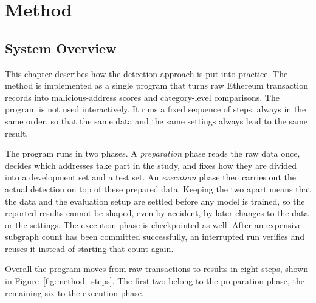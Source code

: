 \documentclass{thesisclass}
\begin{document}
\chapter{Method} 
\label{ch:method}

\section{System Overview}
\label{sec:system_overview}

This chapter describes how the detection approach is put into practice. The
method is implemented as a single program that turns raw Ethereum transaction
records into malicious-address scores and category-level comparisons. The
program is not used interactively. It runs a fixed sequence of steps, always in
the same order, so that the same data and the same settings always lead to the
same result.

The program runs in two phases. A \emph{preparation} phase reads the raw data
once, decides which addresses take part in the study, and fixes how they are
divided into a development set and a test set. An \emph{execution} phase then carries
out the actual detection on top of these prepared data. Keeping the two apart
means that the data and the evaluation setup are settled before any model is
trained, so the reported results cannot be shaped, even by accident, by later
changes to the data or the settings. The execution phase is checkpointed as
well. After an expensive subgraph count has been committed successfully, an
interrupted run verifies and reuses it instead of starting that count again.

Overall the program moves from raw transactions to results in eight steps, shown
in Figure~\ref{fig:method_steps}. The first two belong to the preparation phase,
the remaining six to the execution phase.
\end{document}
